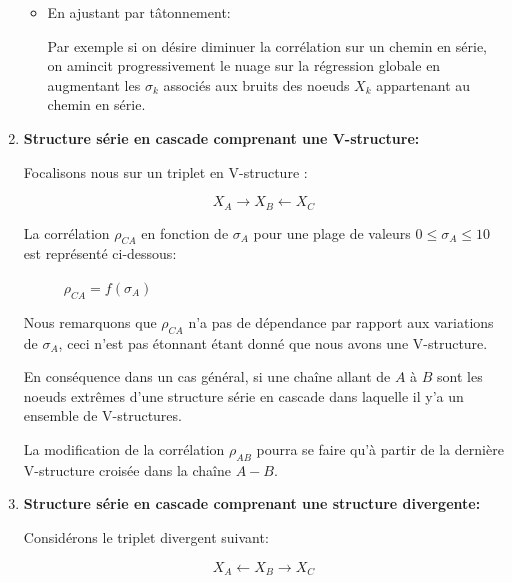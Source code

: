 \documentclass[a4paper]{article}
\begin{document}
\begin{enumerate}
\begin{itemize}
\item En ajustant par tâtonnement:

Par exemple si on désire   diminuer la corrélation sur un chemin en série, on amincit progressivement le nuage  sur la régression globale en augmentant les $\sigma_{k}$ associés aux bruits des noeuds $X_{k}$ appartenant au chemin en série.

\end{itemize}


\item \textbf{ Structure série en cascade comprenant une V-structure:}

Focalisons nous  sur un triplet en V-structure :

$$X_{A}\longrightarrow X_{B}\longleftarrow X_{C}$$

La corrélation $\rho_{CA}$ en fonction de $\sigma_{A}$ pour une plage de valeurs $0\le \sigma_{A} \le 10$ est représenté ci-dessous:
\begin{figure}[H]
\centering
{}
\caption{   $\rho_{CA}=f(\sigma_{A})$ }
\end{figure}

Nous remarquons que $\rho_{CA}$ n'a pas de dépendance par rapport aux variations de $\sigma_{A}$, ceci n'est pas étonnant étant donné  que nous avons une V-structure.

En conséquence dans un cas général, si une chaîne allant de $A$ à $B$ sont les noeuds extrêmes d'une structure série  en cascade dans laquelle il y'a un ensemble de V-structures.

La modification de la corrélation $\rho_{AB}$ pourra se faire qu'à partir de la dernière V-structure croisée dans la chaîne $A-B$.

\item \textbf{Structure série en cascade comprenant une structure divergente:}

Considérons le triplet divergent  suivant:

$$X_{A}\longleftarrow X_{B}\longrightarrow X_{C}$$


\end{enumerate}
\end{document}
